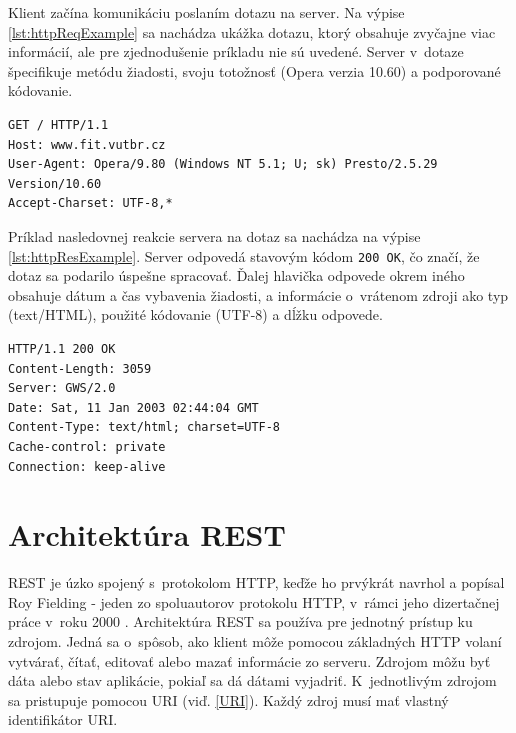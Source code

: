 \documentclass[slovak]{fitthesis}
\begin{document}
Klient začína komunikáciu poslaním dotazu na server. Na výpise \ref{lst:httpReqExample} sa nachádza ukážka dotazu, ktorý obsahuje zvyčajne viac informácií, ale pre zjednodušenie príkladu nie sú uvedené. Server v~dotaze špecifikuje metódu žiadosti, svoju totožnosť (Opera verzia 10.60) a podporované kódovanie.
\begin{lstlisting}[caption=príklad HTTP dotazu,frame=tlrb,label={lst:httpReqExample}]
GET / HTTP/1.1
Host: www.fit.vutbr.cz
User-Agent: Opera/9.80 (Windows NT 5.1; U; sk) Presto/2.5.29 Version/10.60
Accept-Charset: UTF-8,*
\end{lstlisting}
Príklad nasledovnej reakcie servera na dotaz sa nachádza na výpise \ref{lst:httpResExample}. Server odpovedá stavovým kódom \texttt{200 OK}, čo značí, že dotaz sa podarilo úspešne spracovať. Ďalej hlavička odpovede okrem iného obsahuje dátum a čas vybavenia žiadosti, a informácie o~vrátenom zdroji ako typ (text/HTML), použité kódovanie (UTF-8) a dĺžku odpovede. 
\begin{lstlisting}[caption=príklad HTTP odpovedi,frame=tlrb,label={lst:httpResExample}]
HTTP/1.1 200 OK
Content-Length: 3059
Server: GWS/2.0
Date: Sat, 11 Jan 2003 02:44:04 GMT
Content-Type: text/html; charset=UTF-8
Cache-control: private
Connection: keep-alive
\end{lstlisting}



\section{Architektúra REST}\label{rest}
REST je úzko spojený s~protokolom HTTP, keďže ho prvýkrát navrhol a popísal Roy Fielding - jeden zo spoluautorov protokolu HTTP, v~rámci jeho dizertačnej práce v~roku 2000 \cite{dizertackaREST}.
Architektúra REST sa používa pre jednotný prístup ku zdrojom. Jedná sa o~spôsob, ako klient môže pomocou základných HTTP volaní vytvárať, čítať, editovať alebo mazať informácie zo serveru. Zdrojom môžu byť dáta alebo stav aplikácie, pokiaľ sa dá dátami vyjadriť. K~jednotlivým zdrojom sa pristupuje pomocou URI (viď. \ref{URI}). Každý zdroj musí mať vlastný identifikátor URI.
\end{document}
